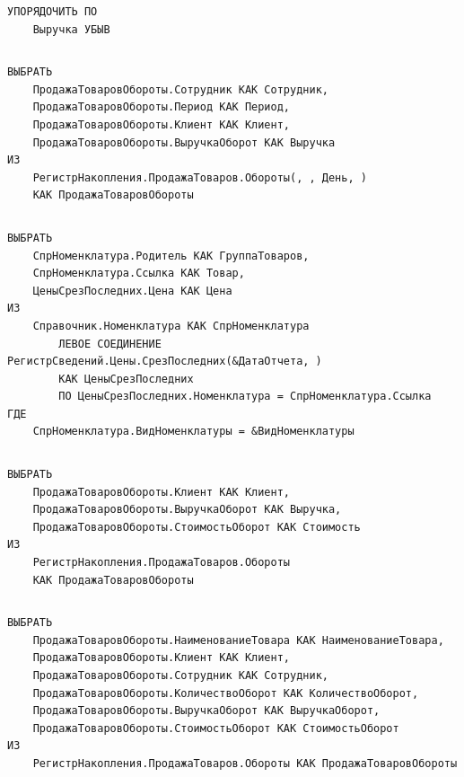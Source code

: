 \documentclass[12pt,a4paper]{article}
\begin{document}
\begin{appendices}
\begin{verbatim}
УПОРЯДОЧИТЬ ПО
    Выручка УБЫВ
\end{verbatim}

\begin{lstlisting}[caption=Запрос к отчету <<Рейтинг товаров>>]
\end{lstlisting}

\begin{verbatim}
ВЫБРАТЬ
    ПродажаТоваровОбороты.Сотрудник КАК Сотрудник,
    ПродажаТоваровОбороты.Период КАК Период,
    ПродажаТоваровОбороты.Клиент КАК Клиент,
    ПродажаТоваровОбороты.ВыручкаОборот КАК Выручка
ИЗ
    РегистрНакопления.ПродажаТоваров.Обороты(, , День, )
	КАК ПродажаТоваровОбороты
\end{verbatim}

\begin{lstlisting}[caption=Запрос к отчету <<Выручка работников>>]
\end{lstlisting}

\begin{verbatim}
ВЫБРАТЬ
    СпрНоменклатура.Родитель КАК ГруппаТоваров,
    СпрНоменклатура.Ссылка КАК Товар,
    ЦеныСрезПоследних.Цена КАК Цена
ИЗ
    Справочник.Номенклатура КАК СпрНоменклатура
        ЛЕВОЕ СОЕДИНЕНИЕ РегистрСведений.Цены.СрезПоследних(&ДатаОтчета, )
        КАК ЦеныСрезПоследних
        ПО ЦеныСрезПоследних.Номенклатура = СпрНоменклатура.Ссылка
ГДЕ
    СпрНоменклатура.ВидНоменклатуры = &ВидНоменклатуры
\end{verbatim}

\begin{lstlisting}[caption=Запрос к отчету <<Перечень товаров>>]
\end{lstlisting}

\begin{verbatim}
ВЫБРАТЬ
    ПродажаТоваровОбороты.Клиент КАК Клиент,
    ПродажаТоваровОбороты.ВыручкаОборот КАК Выручка,
    ПродажаТоваровОбороты.СтоимостьОборот КАК Стоимость
ИЗ
    РегистрНакопления.ПродажаТоваров.Обороты
    КАК ПродажаТоваровОбороты
\end{verbatim}

\begin{lstlisting}[caption=Запрос к отчету <<Рейтинг клиентов>>]
\end{lstlisting}

\begin{verbatim}
ВЫБРАТЬ
    ПродажаТоваровОбороты.НаименованиеТовара КАК НаименованиеТовара,
    ПродажаТоваровОбороты.Клиент КАК Клиент,
    ПродажаТоваровОбороты.Сотрудник КАК Сотрудник,
    ПродажаТоваровОбороты.КоличествоОборот КАК КоличествоОборот,
    ПродажаТоваровОбороты.ВыручкаОборот КАК ВыручкаОборот,
    ПродажаТоваровОбороты.СтоимостьОборот КАК СтоимостьОборот
ИЗ
    РегистрНакопления.ПродажаТоваров.Обороты КАК ПродажаТоваровОбороты
\end{verbatim}


\end{appendices}
\end{document}

